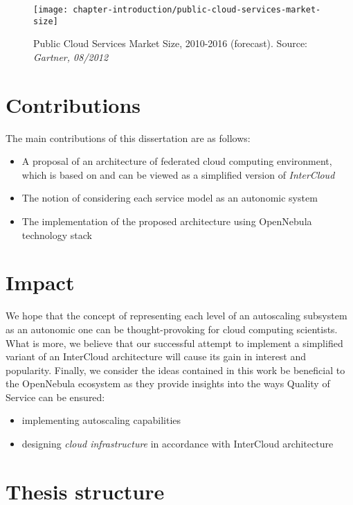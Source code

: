 \begin{figure}[!ht]
  \begin{center}
    \texttt{[image: chapter-introduction/public-cloud-services-market-size]}
  \end{center}
  \caption{Public Cloud Services Market Size, 2010-2016 (forecast). Source: \textit{Gartner, 08/2012}}
  \label{chapter-fig:public-cloud-services-market-size}
\end{figure}

\section{Contributions}
The main contributions of this dissertation are as follows:
\begin{itemize}
  \item A proposal of an architecture of federated cloud computing environment, which is based on and can be viewed as a simplified version of \emph{InterCloud}
  \item The notion of considering each service model as an autonomic system
  \item The implementation of the proposed architecture using OpenNebula technology stack
\end{itemize}

\section{Impact}
We hope that the concept of representing each level of an autoscaling subsystem as an autonomic one can be thought-provoking for cloud computing scientists.  What is more, we believe that our successful attempt to implement a simplified variant of an InterCloud architecture will cause its gain in interest and popularity. 
Finally, we consider the ideas contained in this work be beneficial to the OpenNebula ecosystem as they provide insights into the ways Quality of Service can be ensured:
\begin{itemize}
  \item implementing autoscaling capabilities
  \item designing \emph{cloud infrastructure} in accordance with InterCloud architecture
\end{itemize}

\section{Thesis structure}
